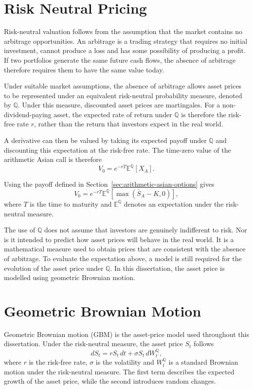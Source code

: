 \section{Risk Neutral Pricing}
\label{sec:risk-neutral-pricing}

Risk-neutral valuation follows from the assumption that the market contains no arbitrage opportunities. An arbitrage is a trading strategy that requires no initial investment, cannot produce a loss and has some possibility of producing a profit. If two portfolios generate the same future cash flows, the absence of arbitrage therefore requires them to have the same value today.

Under suitable market assumptions, the absence of arbitrage allows asset prices to be represented under an equivalent risk-neutral probability measure, denoted by \(\mathbb{Q}\). Under this measure, discounted asset prices are martingales. For a non-dividend-paying asset, the expected rate of return under \(\mathbb{Q}\) is therefore the risk-free rate \(r\), rather than the return that investors expect in the real world.

A derivative can then be valued by taking its expected payoff under \(\mathbb{Q}\) and discounting this expectation at the risk-free rate. The time-zero value of the arithmetic Asian call is therefore
\[
V_0
=
e^{-rT}
\mathbb{E}^{\mathbb{Q}}
\left[
X_A
\right].
\]

Using the payoff defined in Section~\ref{sec:arithmetic-asian-options} gives
\[
V_0
=
e^{-rT}
\mathbb{E}^{\mathbb{Q}}
\left[
\max\left(\bar{S}_A-K,0\right)
\right],
\]
where \(T\) is the time to maturity and \(\mathbb{E}^{\mathbb{Q}}\) denotes an expectation under the risk-neutral measure.

The use of \(\mathbb{Q}\) does not assume that investors are genuinely indifferent to risk. Nor is it intended to predict how asset prices will behave in the real world. It is a mathematical measure used to obtain prices that are consistent with the absence of arbitrage. To evaluate the expectation above, a model is still required for the evolution of the asset price under \(\mathbb{Q}\). In this dissertation, the asset price is modelled using geometric Brownian motion.

\section{Geometric Brownian Motion}
\label{sec:gbm}

Geometric Brownian motion (GBM) is the asset-price model used throughout this dissertation. Under the risk-neutral measure, the asset price \(S_t\) follows
\[
dS_t
=
rS_t\,dt
+
\sigma S_t\,dW_t^{\mathbb{Q}},
\]
where \(r\) is the risk-free rate, \(\sigma\) is the volatility and \(W_t^{\mathbb{Q}}\) is a standard Brownian motion under the risk-neutral measure. The first term describes the expected growth of the asset price, while the second introduces random changes.


